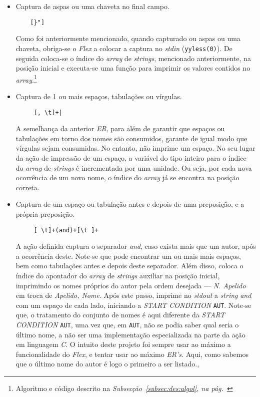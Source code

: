 \begin{itemize}
  \item Captura de aspas ou uma chaveta no final campo.

    \begin{verbatim}
    [}"]
    \end{verbatim}

		Como foi anteriormente mencionado, quando capturado ou aspas ou uma chaveta,
		obriga-se o \emph{Flex} a colocar a captura no \emph{stdin}
		(\texttt{yyless(0)}). De seguida coloca-se o índice do \emph{array} de
		\emph{strings}, mencionado anteriormente, na posição inicial e executa-se
		uma função para imprimir os valores contidos no
		\emph{array}.\footnote{Algoritmo e código descrito na
			\emph{Subsecção~\ref{subsec:des:algol}, na
			pág.~\pageref{subsec:des:algol}}}

  \item Captura de 1 ou mais espaços, tabulações ou vírgulas.
     \begin{verbatim}
     [, \t]+|
     \end{verbatim}
     A semelhança da anterior \emph{ER}, para além de garantir que espaços ou
     tabulações em torno dos nomes são consumidos, garante de igual modo que
     vírgulas sejam consumidas. No entanto, não imprime um espaço. No seu lugar
     da ação de impressão de um espaço, a variável do tipo inteiro para o índice
     do \emph{array} de \emph{strings} é incrementada por uma unidade. Ou seja,
     por cada nova ocorrência de um novo nome, o índice do \emph{array} já se
     encontra na posição correta.

   \item Captura de um espaço ou tabulação antes e depois de uma
     preposição, e a própria preposição.
    \begin{verbatim}
     [ \t]+(and)+[\t ]+
    \end{verbatim}
    A ação definida captura o separador \emph{and}, caso exista mais que um autor, após
    a ocorrência deste. Note-se que pode encontrar um ou mais mais espaços, bem
    como tabulações antes e depois deste separador. Além disso, coloca
    o índice do apontador do \emph{array} de \emph{strings} auxiliar na posição
    inicial, imprimindo os nomes próprios do autor pela ordem desejada ---
    \emph{N. Apelido} em troca de \emph{Apelido, Nome}. Após
    este passo, imprime no \emph{stdout} a \emph{string} \emph{and} com um espaço
    de cada lado, iniciando a \emph{START CONDITION} \texttt{AUT}.
    Note-se que, o tratamento do conjunto de nomes é aqui diferente da \emph{START
    CONDITION} \texttt{AUT}, uma vez que, em \texttt{AUT}, não se podia saber
    qual seria o último nome, a não ser uma implementação especializada na parte
    da ação em linguagem \emph{C}. O intuito deste projeto foi sempre usar ao máximo
    a funcionalidade do \emph{Flex}, e tentar usar ao máximo \emph{ER's}. Aqui,
    como sabemos que o último nome do autor é logo o primeiro a ser listado.,


\end{itemize}

